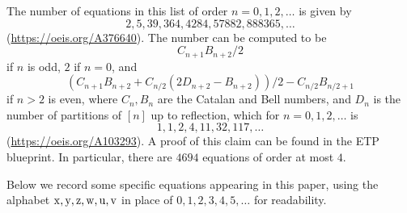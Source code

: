The number of equations in this list of order $n=0,1,2,\dots$ is given by
$$ 2, 5, 39, 364, 4284, 57882, 888365, \dots$$
(\url{https://oeis.org/A376640}).  The number can be computed to be
$$ C_{n+1} B_{n+2}/2$$
if $n$ is odd, $2$ if $n=0$, and
$$ (C_{n+1} B_{n+2}+ C_{n/2}(2D_{n+2}-B_{n+2}))/2 - C_{n/2} B_{n/2+1}$$
if $n > 2$ is even, where $C_n, B_n$ are the Catalan and Bell numbers, and $D_n$ is the number of partitions of $[n]$ up to reflection, which for $n=0,1,2,\dots$ is
$$ 1, 1, 2, 4, 11, 32, 117, \dots$$
(\url{https://oeis.org/A103293}).  A proof of this claim can be found in the ETP blueprint.  In particular, there are $4694$ equations of order at most $4$.

Below we record some specific equations appearing in this paper, using the alphabet $\mathrm{x},\mathrm{y},\mathrm{z},\mathrm{w},\mathrm{u},\mathrm{v}$ in place of $0,1,2,3,4,5,\dots$ for readability.
